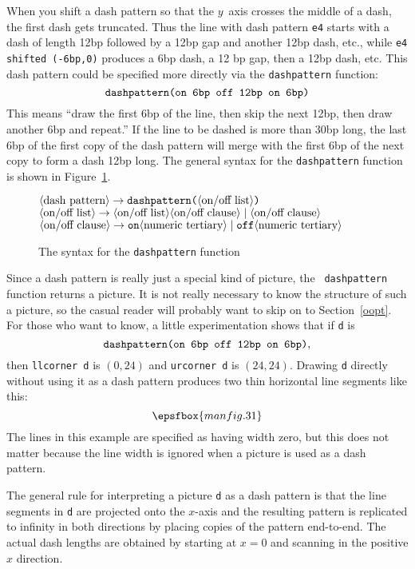 \documentclass{article} %
\newcommand\descr[1]{{\langle\hbox{#1}\rangle}}
\begin{document}
When you shift a dash pattern so that the $y$~axis crosses the middle of
a dash, the first dash gets truncated.  Thus the line with dash pattern
{\tt e4} starts with a dash of length 12bp followed by a 12bp gap and
another 12bp dash, etc., while {\tt e4 shifted (-6bp,0)} produces a 6bp
dash, a 12 bp gap, then a 12bp dash, etc.  This dash pattern could be
specified more directly via the {\tt dashpattern}\label{Ddshpat} function:
$$ \hbox{\tt dashpattern(on 6bp  off 12bp  on 6bp)} $$
This means ``draw the first 6bp of the line, then skip the next 12bp, then draw
another 6bp and repeat.'' If the line to be dashed is more than 30bp long, the
last 6bp of the first copy of the dash pattern will merge with the first 6bp of
the next copy to form a dash 12bp long.  The general syntax for the
{\tt dashpattern} function is shown in Figure~\ref{sydash}.

\begin{figure}[htp]
\begin{ctabbing}
$\tt \descr{dash pattern} \rightarrow dashpattern
        \hbox{\tt (}\descr{on/off list}\hbox{\tt )}$\\
$\tt \descr{on/off list} \rightarrow
        \descr{on/off list}\descr{on/off clause} \;|\; \descr{on/off clause}$\\
$\tt \descr{on/off clause} \rightarrow on \descr{numeric tertiary}
        \;|\; off \descr{numeric tertiary}$
\end{ctabbing}
\caption{The syntax for the {\tt dashpattern} function}
\label{sydash}
\end{figure}

Since a dash pattern is really just a special kind of picture, the {\tt
dashpattern} function returns a picture.  It is not really necessary to
know the structure of such a picture, so the casual reader will probably
want to skip on to Section~\ref{oopt}.  For those who want to know, a
little experimentation shows that if {\tt d} is
$$ \hbox{\tt dashpattern(on 6bp  off 12bp  on 6bp)}, $$
then {\tt llcorner d} is $(0,24)$ and {\tt urcorner d} is $(24,24)$.
Drawing {\tt d} directly without using it as a dash pattern produces two
thin horizontal line segments like this:
$$ \epsfbox{manfig.31} $$
The lines in this example are specified as having width zero, but this
does not matter because the line width is ignored when a picture is used
as a dash pattern.

The general rule for interpreting a picture {\tt d} as a dash pattern is
that the line segments in {\tt d} are projected onto the $x$-axis and
the resulting pattern is replicated to infinity in both directions by
placing copies of the pattern end-to-end.  The actual dash lengths are
obtained by starting at $x=0$ and scanning in the positive $x$
direction.
\end{document}
